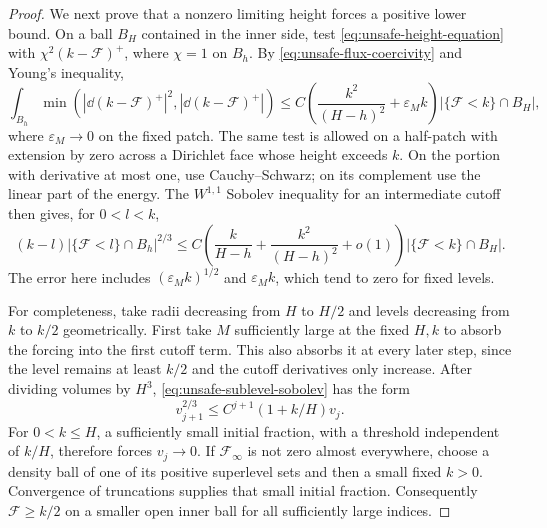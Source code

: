 \begin{proof}
We next prove that a nonzero limiting height forces a positive lower
bound.  On a ball \(B_H\) contained in the inner side, test
\eqref{eq:unsafe-height-equation} with
\(\chi^2(k-\mathcal F)^+\), where \(\chi=1\) on \(B_h\).
By \eqref{eq:unsafe-flux-coercivity} and Young's inequality,
\begin{equation}
 \int_{B_h}\min(|\dd(k-\mathcal F)^+|^2,
                        |\dd(k-\mathcal F)^+|)
 \le C\left(\frac{k^2}{(H-h)^2}+\varepsilon_M k\right)
              |\{\mathcal F<k\}\cap B_H|,
 \label{eq:unsafe-sublevel-energy}
\end{equation}
where \(\varepsilon_M\to0\) on the fixed patch.  The same test is
allowed on a half-patch with extension by zero across a Dirichlet
face whose height exceeds \(k\).  On the portion with derivative at
most one, use Cauchy--Schwarz; on its complement use the linear part
of the energy.  The \(W^{1,1}\) Sobolev inequality for an
intermediate cutoff then gives, for \(0<l<k\),
\begin{equation}
 (k-l)|\{\mathcal F<l\}\cap B_h|^{2/3}
 \le C\left(\frac{k}{H-h}+
             \frac{k^2}{(H-h)^2}+o(1)\right)
                |\{\mathcal F<k\}\cap B_H|.
 \label{eq:unsafe-sublevel-sobolev}
\end{equation}
The error here includes \((\varepsilon_M k)^{1/2}\) and
\(\varepsilon_M k\), which tend to zero for fixed levels.

For completeness, take radii decreasing from \(H\) to \(H/2\)
and levels decreasing from \(k\) to \(k/2\) geometrically.  First
take \(M\) sufficiently large at the fixed \(H,k\) to absorb the
forcing into the first cutoff term.  This also absorbs it at every
later step, since the level remains at least \(k/2\) and the cutoff
derivatives only increase.  After dividing volumes by \(H^3\),
\eqref{eq:unsafe-sublevel-sobolev} has the form
\begin{equation}
 v_{j+1}^{2/3}\le C^{j+1}(1+k/H)v_j.
 \label{eq:unsafe-sublevel-iteration}
\end{equation}
For \(0<k\le H\), a sufficiently small initial fraction, with a
threshold independent of \(k/H\), therefore forces \(v_j\to0\).
If \(\mathcal F_\infty\) is not zero almost everywhere, choose
a density ball of one of its positive superlevel sets and then a
small fixed \(k>0\).  Convergence of truncations supplies that
small initial fraction.  Consequently \(\mathcal F\ge k/2\)
on a smaller open inner ball for all sufficiently large indices.


\end{proof}
